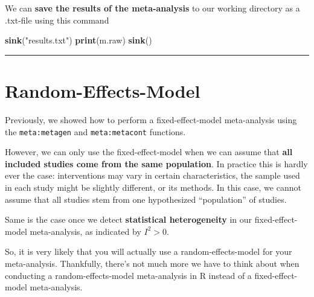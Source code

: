 \documentclass[]{book}
\newenvironment{Shaded}{\begin{snugshade}}{\end{snugshade}}
\newcommand{\KeywordTok}[1]{\textcolor[rgb]{0.13,0.29,0.53}{\textbf{#1}}}
\newcommand{\StringTok}[1]{\textcolor[rgb]{0.31,0.60,0.02}{#1}}
\newcommand{\NormalTok}[1]{#1}
\theoremstyle{definition}
\theoremstyle{definition}
\theoremstyle{definition}
\theoremstyle{remark}
\begin{document}
We can \textbf{save the results of the meta-analysis} to our working
directory as a .txt-file using this command

\begin{Shaded}
\begin{Highlighting}[]
\KeywordTok{sink}\NormalTok{(}\StringTok{"results.txt"}\NormalTok{)}
\KeywordTok{print}\NormalTok{(m.raw)}
\KeywordTok{sink}\NormalTok{()}
\end{Highlighting}
\end{Shaded}

\begin{center}\rule{0.5\linewidth}{\linethickness}\end{center}

\hypertarget{random}{\section{Random-Effects-Model}\label{random}}

Previously, we showed how to perform a fixed-effect-model meta-analysis
using the \texttt{meta:metagen} and \texttt{meta:metacont} functions.

However, we can only use the fixed-effect-model when we can assume that
\textbf{all included studies come from the same population}. In practice
this is hardly ever the case: interventions may vary in certain
characteristics, the sample used in each study might be slightly
different, or its methods. In this case, we cannot assume that all
studies stem from one hypothesized ``population'' of studies.

Same is the case once we detect \textbf{statistical heterogeneity} in
our fixed-effect-model meta-analysis, as indicated by \(I^{2}>0\).

So, it is very likely that you will actually use a random-effects-model
for your meta-analysis. Thankfully, there's not much more we have to
think about when conducting a random-effects-model meta-analysis in R
instead of a fixed-effect-model meta-analysis.
\end{document}
